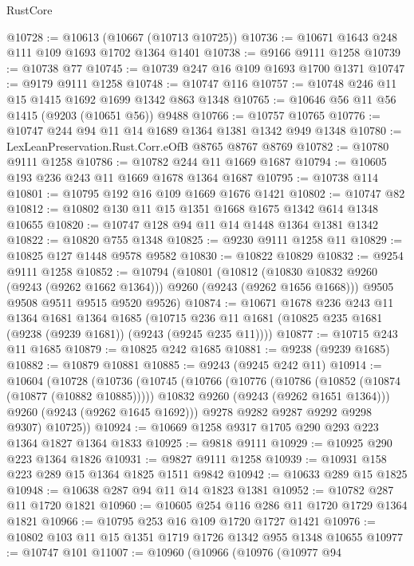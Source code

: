 \begin{lexlean}{RustCore}
\begin{coremodule}
@10728 := @10613 (@10667 (@10713 @10725))
@10736 := @10671 @1643 @248 @111 @109 @1693 @1702 @1364 @1401
@10738 := @9166 @9111 @1258
@10739 := @10738 @77
@10745 := @10739 @247 @16 @109 @1693 @1700 @1371
@10747 := @9179 @9111 @1258
@10748 := @10747 @116
@10757 := @10748 @246 @11 @15 @1415 @1692 @1699 @1342 @863 @1348
@10765 := @10646 @56 @11 @56 @1415 (@9203 (@10651 @56)) @9488
@10766 := @10757 @10765
@10776 := @10747 @244 @94 @11 @14 @1689 @1364 @1381 @1342 @949 @1348
@10780 := LexLeanPreservation.Rust.Corr.eOfB @8765 @8767 @8769
@10782 := @10780 @9111 @1258
@10786 := @10782 @244 @11 @1669 @1687
@10794 := @10605 @193 @236 @243 @11 @1669 @1678 @1364 @1687
@10795 := @10738 @114
@10801 := @10795 @192 @16 @109 @1669 @1676 @1421
@10802 := @10747 @82
@10812 := @10802 @130 @11 @15 @1351 @1668 @1675 @1342 @614 @1348 @10655
@10820 := @10747 @128 @94 @11 @14 @1448 @1364 @1381 @1342
@10822 := @10820 @755 @1348
@10825 := @9230 @9111 @1258 @11
@10829 := @10825 @127 @1448 @9578 @9582
@10830 := @10822 @10829
@10832 := @9254 @9111 @1258
@10852 := @10794
    (@10801
      (@10812 (@10830 @10832 @9260 (@9243 (@9262 @1662 @1364))) @9260 (@9243 (@9262 @1656 @1668)))
      @9505
      @9508
      @9511
      @9515
      @9520
      @9526)
@10874 := @10671
    @1678
    @236
    @243
    @11
    @1364
    @1681
    @1364
    @1685
    (@10715 @236 @11 @1681 (@10825 @235 @1681 (@9238 (@9239 @1681)) (@9243 (@9245 @235 @11))))
@10877 := @10715 @243 @11 @1685
@10879 := @10825 @242 @1685
@10881 := @9238 (@9239 @1685)
@10882 := @10879 @10881
@10885 := @9243 (@9245 @242 @11)
@10914 := @10604
    (@10728
      (@10736
        (@10745
          (@10766
            (@10776
              (@10786 (@10852 (@10874 (@10877 (@10882 @10885)))))
              @10832
              @9260
              (@9243 (@9262 @1651 @1364)))
            @9260
            (@9243 (@9262 @1645 @1692)))
          @9278
          @9282
          @9287
          @9292
          @9298
          @9307)
        @10725))
@10924 := @10669 @1258 @9317 @1705 @290 @293 @223 @1364 @1827 @1364 @1833
@10925 := @9818 @9111
@10929 := @10925 @290 @223 @1364 @1826
@10931 := @9827 @9111 @1258
@10939 := @10931 @158 @223 @289 @15 @1364 @1825 @1511 @9842
@10942 := @10633 @289 @15 @1825
@10948 := @10638 @287 @94 @11 @14 @1823 @1381
@10952 := @10782 @287 @11 @1720 @1821
@10960 := @10605 @254 @116 @286 @11 @1720 @1729 @1364 @1821
@10966 := @10795 @253 @16 @109 @1720 @1727 @1421
@10976 := @10802 @103 @11 @15 @1351 @1719 @1726 @1342 @955 @1348 @10655
@10977 := @10747 @101
@11007 := @10960
    (@10966
      (@10976
        (@10977
          @94

\end{coremodule}
\end{lexlean}
